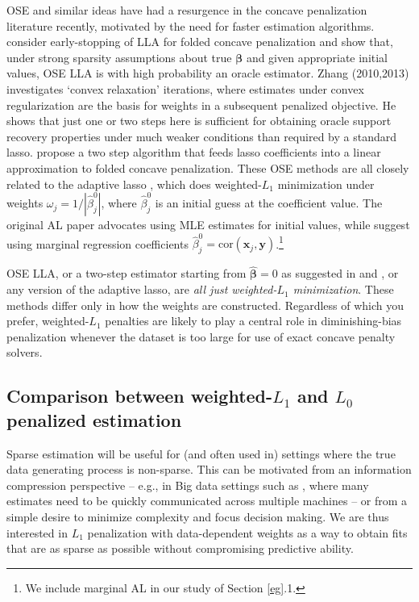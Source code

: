 \documentclass[12pt]{article}
\newcommand{\bs}[1]{\boldsymbol{#1}}
\newcommand{\mr}[1]{\mathrm{#1}}
\newcommand{\bm}[1]{\mathbf{#1}}
\begin{document}
OSE and similar ideas have had a resurgence in the concave penalization
literature recently, motivated by the need for faster estimation algorithms.
\cite{fan_strong_2014} consider early-stopping of LLA for folded concave
penalization  and show that, under strong sparsity assumptions about true
$\bs{\beta}$ and given appropriate initial values, OSE LLA is with high
probability an oracle estimator.   Zhang (2010,2013)
\nocite{zhang_analysis_2010,zhang_multi-stage_2013} investigates  
`convex relaxation' iterations, where estimates under convex regularization
 are the basis for weights in a subsequent penalized objective.  He shows that
 just one or two steps here is sufficient for obtaining oracle support
 recovery properties under much weaker conditions than required by a standard
 lasso.  \cite{wang_calibrating_2013} propose a two step algorithm that feeds
 lasso coefficients into a linear approximation to folded concave
 penalization.  These OSE methods are all closely related to  the adaptive lasso
\citep[AL;][]{zou_adaptive_2006}, which does weighted-$L_1$ minimization under
weights $\omega_j = 1/|\hat\beta^0_j|$, where $\hat\beta^0_j$ is an initial
guess at the coefficient value.  The original AL paper advocates using MLE
estimates for initial values, while
\cite{huang_adaptive_2008} suggest using marginal regression coefficients
$\hat\beta^0_j = \mr{cor}(\bm{x}_j,\bm{y})$.\footnote{We include marginal AL in our study
of Section \ref{eg}.1.}

OSE LLA, or a two-step estimator starting from
$\bs{\hat\beta}=0$ as suggested in \cite{fan_strong_2014} and
\cite{wang_calibrating_2013}, or any version of the adaptive lasso, are {\it all just weighted-$L_1$
minimization}. These methods differ only in how the
weights are constructed.  Regardless of which you prefer, weighted-$L_1$
penalties are likely to play a central role in diminishing-bias penalization
whenever the dataset is too large for use of exact concave penalty solvers.


\subsection{Comparison between weighted-$L_1$ and $L_0$ penalized estimation}


Sparse estimation will be useful for (and often used in) settings where the
true data generating process is non-sparse. This can be motivated from an
information compression  perspective -- e.g., in Big data settings such as
\cite{taddy_distributed_2013}, where many estimates need to be quickly
communicated across multiple machines -- or from a simple desire to minimize
complexity and focus decision making.    We are thus interested in $L_1$
penalization with data-dependent weights as a way to obtain fits that are as
sparse as possible without compromising predictive ability.  
\end{document}
